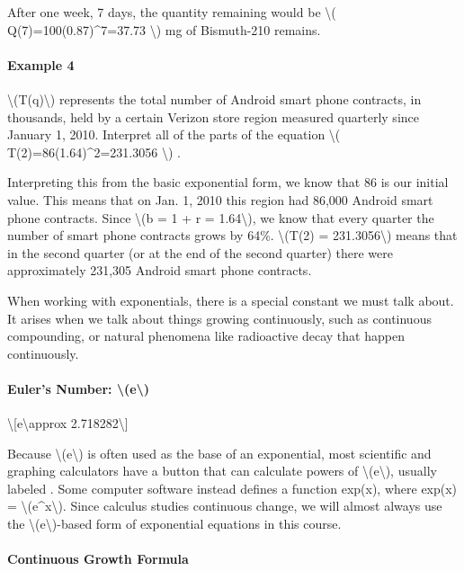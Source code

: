 After one week, 7 days, the quantity remaining would be
\textbackslash{}( Q(7)=100(0.87)\^{}7=37.73 \textbackslash{}) mg of
Bismuth-210 remains.

\hypertarget{example-4}{%
\paragraph{Example 4}\label{example-4}}

\textbackslash{}(T(q)\textbackslash{}) represents the total number of
Android smart phone contracts, in thousands, held by a certain Verizon
store region measured quarterly since January 1, 2010. Interpret all of
the parts of the equation \textbackslash{}( T(2)=86(1.64)\^{}2=231.3056
\textbackslash{}) .

Interpreting this from the basic exponential form, we know that 86 is
our initial value. This means that on Jan. 1, 2010 this region had
86,000 Android smart phone contracts. Since \textbackslash{}(b = 1 + r =
1.64\textbackslash{}), we know that every quarter the number of smart
phone contracts grows by 64\%. \textbackslash{}(T(2) =
231.3056\textbackslash{}) means that in the second quarter (or at the
end of the second quarter) there were approximately 231,305 Android
smart phone contracts.

When working with exponentials, there is a special constant we must talk
about. It arises when we talk about things growing continuously, such as
continuous compounding, or natural phenomena like radioactive decay that
happen continuously.

\hypertarget{eulers-number-e}{%
\paragraph{Euler's Number:
\textbackslash{}(e\textbackslash{})}\label{eulers-number-e}}

\textbackslash{}{[}e\textbackslash{}approx 2.718282\textbackslash{}{]}

Because \textbackslash{}(e\textbackslash{}) is often used as the base of
an exponential, most scientific and graphing calculators have a button
that can calculate powers of \textbackslash{}(e\textbackslash{}),
usually labeled . Some computer software instead defines a function
exp(x), where exp(x) = \textbackslash{}(e\^{}x\textbackslash{}). Since
calculus studies continuous change, we will almost always use the
\textbackslash{}(e\textbackslash{})-based form of exponential equations
in this course.

\hypertarget{continuous-growth-formula}{%
\paragraph{Continuous Growth Formula}\label{continuous-growth-formula}}

